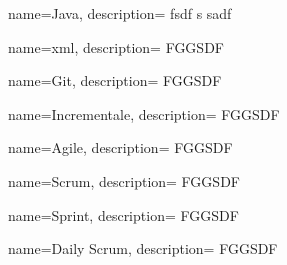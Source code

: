 {
  name=Java,
  description={ fsdf s sadf }
}

{
  name=xml,
  description={ FGGSDF }
}

{
  name=Git,
  description={ FGGSDF }
}

{
  name=Incrementale,
  description={ FGGSDF }
}

{
  name=Agile,
  description={ FGGSDF }
}

{
  name=Scrum,
  description={ FGGSDF }
}

{
  name=Sprint,
  description={ FGGSDF }
}

{
  name=Daily Scrum,
  description={ FGGSDF }
}
